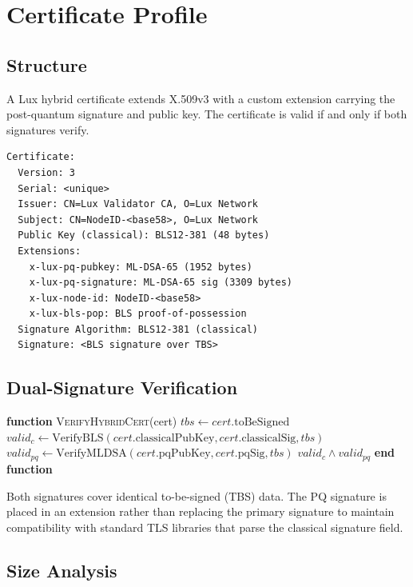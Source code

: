 \documentclass[11pt]{article}
\begin{document}
\section{Certificate Profile}

\subsection{Structure}

A Lux hybrid certificate extends X.509v3 with a custom extension carrying the post-quantum signature and public key. The certificate is valid if and only if both signatures verify.

\begin{verbatim}
Certificate:
  Version: 3
  Serial: <unique>
  Issuer: CN=Lux Validator CA, O=Lux Network
  Subject: CN=NodeID-<base58>, O=Lux Network
  Public Key (classical): BLS12-381 (48 bytes)
  Extensions:
    x-lux-pq-pubkey: ML-DSA-65 (1952 bytes)
    x-lux-pq-signature: ML-DSA-65 sig (3309 bytes)
    x-lux-node-id: NodeID-<base58>
    x-lux-bls-pop: BLS proof-of-possession
  Signature Algorithm: BLS12-381 (classical)
  Signature: <BLS signature over TBS>
\end{verbatim}

\subsection{Dual-Signature Verification}

\begin{algorithmic}[1]
\State \textbf{function} \textsc{VerifyHybridCert}(cert)
\State $tbs \gets cert.\text{toBeSigned}$
\State $valid_c \gets \text{VerifyBLS}(cert.\text{classicalPubKey}, cert.\text{classicalSig}, tbs)$
\State $valid_{pq} \gets \text{VerifyMLDSA}(cert.\text{pqPubKey}, cert.\text{pqSig}, tbs)$
\State \Return $valid_c \land valid_{pq}$
\State \textbf{end function}
\end{algorithmic}

Both signatures cover identical to-be-signed (TBS) data. The PQ signature is placed in an extension rather than replacing the primary signature to maintain compatibility with standard TLS libraries that parse the classical signature field.

\subsection{Size Analysis}
\end{document}
